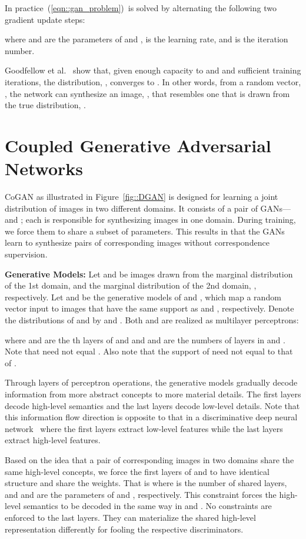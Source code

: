\documentclass{article}
\begin{document}
In practice~(\ref{eqn::gan_problem})~is solved by alternating the following two gradient update steps:

where \theta and \theta are the parameters of  and ,  is the learning rate, and  is the iteration number. 

Goodfellow et al.~\cite{goodfellow2014generative} show that, given enough capacity to  and  and sufficient training iterations, the distribution, , converges to . In other words, from a random vector, , the network  can synthesize an image, , that resembles one that is drawn from the true distribution, .

\section{Coupled Generative Adversarial Networks}\label{sec::dgan}

CoGAN as illustrated in Figure~\ref{fig::DGAN} is designed for learning a joint distribution of images in two different domains. It consists of a pair of GANs--- and ; each is responsible for synthesizing images in one domain. During training, we force them to share a subset of parameters. This results in that the GANs learn to synthesize pairs of corresponding images without correspondence supervision. 

{\bf Generative Models: }
Let  and  be images drawn from the marginal distribution of the 1st domain,  and the marginal distribution of the 2nd domain, , respectively. Let  and  be the generative models of  and , which map a random vector input  to images that have the same support as  and , respectively. Denote the distributions of  and  by  and . Both  and  are realized as multilayer perceptrons: 

where  and  are the th layers of  and  and  and  are the numbers of layers in  and . Note that  need not equal . Also note that the support of  need not equal to that of .

Through layers of perceptron operations, the generative models gradually decode information from more abstract concepts to more material details. The first layers decode high-level semantics and the last layers decode low-level details. Note that this information flow direction is opposite to that in a discriminative deep neural network~\cite{krizhevsky2012imagenet} where the first layers extract low-level features while the last layers extract high-level features. 

Based on the idea that a pair of corresponding images in two domains share the same high-level concepts, we force the first layers of  and  to have identical structure and share the weights. That is 
\theta\theta
where  is the number of shared layers, and \theta and \theta are the parameters of  and , respectively. This constraint forces the high-level semantics to be decoded in the same way in  and . No constraints are enforced to the last layers. They can materialize the shared high-level representation differently for fooling the respective discriminators.
\end{document}
